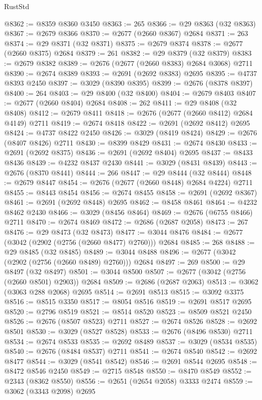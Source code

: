 \begin{lexlean}{RustStd}
\begin{coremodule}
{\begin{coremodule}
{{{{{{{{{{{{{{{{{{{{{{{{{{{{{{{{{{{{{{{{{{{{{{{{{{{{{{{@8362 := @8359 @8360 @3450
@8363 := 265
@8366 := @29 @8363 (@32 @8363)
@8367 := @2679 @8366
@8370 := @2677 (@2660 @8367) @2684
@8371 := 263
@8374 := @29 @8371 (@32 @8371)
@8375 := @2679 @8374
@8378 := @2677 (@2660 @8375) @2684
@8379 := 261
@8382 := @29 @8379 (@32 @8379)
@8383 := @2679 @8382
@8389 := @2676 (@2677 (@2660 @8383) @2684 @3068) @2711
@8390 := @2674 @8389
@8393 := @2691 (@2692 @8383) @2695
@8395 := @4737 @8393 @2450
@8397 := @3029 (@8390 @8395)
@8399 := @2676 (@8378 @8397)
@8400 := 264
@8403 := @29 @8400 (@32 @8400)
@8404 := @2679 @8403
@8407 := @2677 (@2660 @8404) @2684
@8408 := 262
@8411 := @29 @8408 (@32 @8408)
@8412 := @2679 @8411
@8418 := @2676 (@2677 (@2660 @8412) @2684 @4149) @2711
@8419 := @2674 @8418
@8422 := @2691 (@2692 @8412) @2695
@8424 := @4737 @8422 @2450
@8426 := @3029 (@8419 @8424)
@8429 := @2676 (@8407 @8426) @2711
@8430 := @8399 @8429
@8431 := @2674 @8430
@8433 := @2691 (@2692 @8375)
@8436 := @2691 (@2692 @8404) @2695
@8437 := @8433 @8436
@8439 := @4232 @8437 @2430
@8441 := @3029 (@8431 @8439)
@8443 := @2676 (@8370 @8441)
@8444 := 266
@8447 := @29 @8444 (@32 @8444)
@8448 := @2679 @8447
@8454 := @2676 (@2677 (@2660 @8448) @2684 @4224) @2711
@8455 := @8443 @8454
@8456 := @2674 @8455
@8458 := @2691 (@2692 @8367)
@8461 := @2691 (@2692 @8448) @2695
@8462 := @8458 @8461
@8464 := @4232 @8462 @2430
@8466 := @3029 (@8456 @8464)
@8469 := @2676 (@6755 @8466) @2711
@8470 := @2674 @8469
@8472 := @2686 (@2687 @2058)
@8473 := 267
@8476 := @29 @8473 (@32 @8473)
@8477 := @3044 @8476
@8484 := @2677 (@3042 (@2902 (@2756 (@2660 @8477) @2760))) @2684
@8485 := 268
@8488 := @29 @8485 (@32 @8485)
@8489 := @3044 @8488
@8496 := @2677 (@3042 (@2902 (@2756 (@2660 @8489) @2760))) @2684
@8497 := 269
@8500 := @29 @8497 (@32 @8497)
@8501 := @3044 @8500
@8507 := @2677 (@3042 (@2756 (@2660 @8501) @2903)) @2684
@8509 := @2686 (@2687 @2063)
@8513 := @3062 (@3063 @288 @2068) @2695
@8514 := @2691 @8513
@8515 := @3092 @3375
@8516 := @8515 @3350
@8517 := @8054 @8516
@8519 := @2691 @8517 @2695
@8520 := @2796 @8519
@8521 := @8514 @8520
@8523 := @8509 @8521 @2450
@8526 := @2676 (@8507 @8523) @2711
@8527 := @2674 @8526
@8528 := @2692 @8501
@8530 := @3029 (@8527 @8528)
@8533 := @2676 (@8496 @8530) @2711
@8534 := @2674 @8533
@8535 := @2692 @8489
@8537 := @3029 (@8534 @8535)
@8540 := @2676 (@8484 @8537) @2711
@8541 := @2674 @8540
@8542 := @2692 @8477
@8544 := @3029 (@8541 @8542)
@8546 := @2691 @8544 @2695
@8548 := @8472 @8546 @2450
@8549 := @2715 @8548
@8550 := @8470 @8549
@8552 := @2343 (@8362 @8550)
@8556 := @2651 (@2654 @2058) @3333 @2474
@8559 := @3062 (@3343 @2098) @2695
}}}}}}}}}}}}}}}}}}}}}}}}}}}}}}}}}}}}}}}}}}}}}}}}}}}}}}}
\end{coremodule}}
\end{coremodule}
\end{lexlean}
